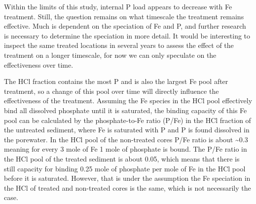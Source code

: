 \documentclass[a4paper,11pt]{article}
\begin{document}
Within the limits of this study, internal P load appears to decrease with Fe treatment. Still, the question remains on what timescale the treatment remains effective. Much is dependent on the speciation of Fe and P, and further research is necessary to determine the speciation in more detail. It would be interesting to inspect the same treated locations in several years to assess the effect of the treatment on a longer timescale, for now we can only speculate on the effectiveness over time.

The HCl fraction contains the most P and is also the largest Fe pool after treatment, so a change of this pool over time will directly influence the effectiveness of the treatment. Assuming the Fe species in the HCl pool effectively bind all dissolved phosphate until it is saturated, the binding capacity of this Fe pool can be calculated by the phosphate-to-Fe ratio (P/Fe) in the HCl fraction of the untreated sediment, where Fe is saturated with P and P is found dissolved in the porewater. In the HCl pool of the non-treated cores P/Fe ratio is about \textasciitilde0.3 meaning for every 3 mole of Fe 1 mole of phosphate is bound. The P/Fe ratio in the HCl pool of the treated sediment is about 0.05, which means that there is still capacity for binding 0.25 mole of phosphate per mole of Fe in the HCl pool before it is saturated. However, that is under the assumption the Fe speciation in the HCl of treated and non-treated cores is the same, which is not necessarily the case.
\end{document}
